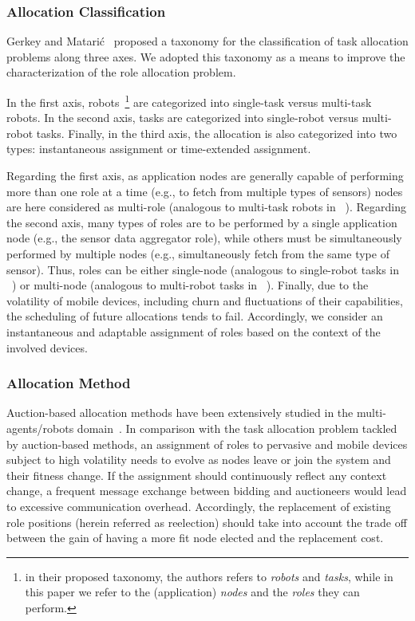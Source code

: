 \subsubsection{\textbf{Allocation Classification}} Gerkey and Matarić~\cite{Gerkey:2004} proposed a taxonomy for the classification of task allocation problems along three axes. We adopted this taxonomy as a means to improve the characterization of the role allocation problem.

In the first axis, robots~\footnote{in their proposed taxonomy, the authors refers to \textit{robots} and \textit{tasks}, while in this paper we refer to the (application) \textit{nodes} and the \textit{roles} they can perform.} 
are categorized into single-task versus multi-task robots. In the second axis, tasks are categorized into single-robot versus multi-robot tasks. Finally, in the third axis, the allocation is also categorized into two types: instantaneous assignment or time-extended assignment.

Regarding the first axis, as application nodes are generally capable of performing more than one role at a time (e.g., to fetch from multiple types of sensors) nodes are here considered as multi-role (analogous to multi-task robots in ~\cite{Gerkey:2004}). Regarding the second axis, many types of roles are to be performed by a single application node (e.g., the sensor data aggregator role), while others must be simultaneously performed by multiple nodes (e.g., simultaneously fetch from the same type of sensor). Thus, roles can be either single-node (analogous to single-robot tasks in ~\cite{Gerkey:2004}) or multi-node (analogous to multi-robot tasks in ~\cite{Gerkey:2004}). Finally, due to the volatility of mobile devices, including churn and fluctuations of their capabilities, the scheduling of future allocations tends to fail. Accordingly, we consider an instantaneous and adaptable assignment of roles based on the context of the involved devices. 

\subsubsection{\textbf{Allocation Method}} Auction-based allocation methods have been extensively studied in the multi-agents/robots domain~\cite{Korsah:2013}. In comparison with the task allocation problem tackled by auction-based methods, an assignment of roles to pervasive and mobile devices subject to high volatility needs to evolve as nodes leave or join the system and their fitness change. If the assignment should continuously reflect any context change, a frequent message exchange between bidding and auctioneers would lead to excessive communication overhead. Accordingly, the replacement of existing role positions (herein referred as reelection) should take into account the trade off between the gain of having a more fit node elected and the replacement cost. 

